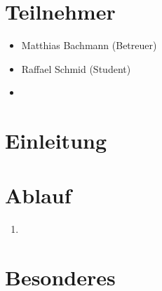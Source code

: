 \section{Teilnehmer}
\begin{itemize}
	\item Matthias Bachmann (Betreuer)
	\item Raffael Schmid (Student)
	\item 
\end{itemize}
\section{Einleitung}

\section{Ablauf}
\begin{enumerate} 
\item 
\end{enumerate}

\section{Besonderes}\label{besonderes}


